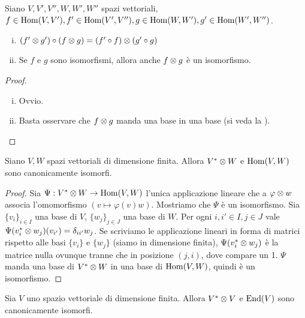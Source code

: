 \begin{proposition}
Siano $V\comma V'\comma V''\comma W\comma W'\comma W''$ spazi vettoriali, $f\in\operatorname{Hom}(V,V'),\allowbreak f'\in\operatorname{Hom}(V',V''),\allowbreak g\in\operatorname{Hom}(W,W'),\allowbreak g'\in\operatorname{Hom}(W',W'')$.
\begin{enumerate}[(i)]
\item $(f'\otimes g')\circ(f\otimes g)=(f'\circ f)\otimes(g'\circ g)$
\item Se $f$ e $g$ sono isomorfismi, allora anche $f\otimes g$ è un isomorfismo.
\end{enumerate}
\end{proposition}
\begin{proof}\leavevmode
\begin{enumerate}[(i)]
\item Ovvio.
\item Basta osservare che $f\otimes g$ manda una base in una base (si veda la ).
\end{enumerate}
\end{proof}

\begin{proposition}
Siano $V\comma W$ spazi vettoriali di dimensione finita. Allora $V^*\otimes W$ e $\operatorname{Hom}(V,W)$ sono canonicamente isomorfi.
\end{proposition}
\begin{proof}
Sia $\Psi:V^*\otimes W\to\operatorname{Hom}(V,W)$ l'unica applicazione lineare che a $\varphi\otimes w$ associa l'omomorfismo $(v\mapsto\varphi(v)w)$. Mostriamo che $\Psi$ è un isomorfismo. Sia $\{v_i\}_{i\in I}$ una base di $V$, $\{w_j\}_{j\in J}$ una base di $W$. Per ogni $i,i'\in I\comma j\in J$ vale $\Psi(v_i^*\otimes w_j)(v_{i'})=\delta_{ii'}w_j$. Se scriviamo le applicazione lineari in forma di matrici rispetto alle basi $\{v_i\}$ e $\{w_j\}$ (siamo in dimensione finita), $\Psi(v_i^*\otimes w_j)$ è la matrice nulla ovunque tranne che in posizione $(j,i)$, dove compare un 1. $\Psi$ manda una base di $V^*\otimes W$ in una base di $\operatorname{Hom}(V,W)$, quindi è un isomorfismo.
\end{proof}

\begin{corollary}
Sia $V$ uno spazio vettoriale di dimensione finita. Allora $V^*\otimes V$ e $\operatorname{End}(V)$ sono canonicamente isomorfi.
\end{corollary}



